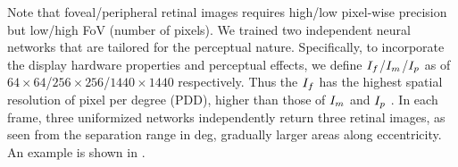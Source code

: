 Note that foveal/peripheral retinal images requires high/low pixel-wise precision but low/high FoV (number of pixels). We trained two independent neural networks that are tailored for the perceptual nature. 
Specifically, to incorporate the display hardware properties and perceptual effects, we define $I_{f}$/$I_{m}$/$I_{p}$ as of $64\times64$/$256\times256$/$1440\times1440$ respectively.
Thus the $I_{f}$ has the highest spatial resolution of  pixel per degree (PDD), higher than those of $I_{m}$  and $I_{p}$ .
In each frame, three uniformized networks independently return three retinal images, as seen from the separation range in deg, gradually larger areas along eccentricity. An example is shown in .

